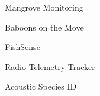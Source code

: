 \item Mangrove Monitoring
\item Baboons on the Move
\item FishSense
\item Radio Telemetry Tracker
\item Acoustic Species ID
